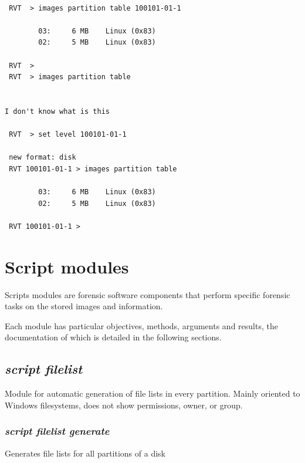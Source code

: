 \documentclass[a4paper,11pt,oneside]{report}
\begin{document}
\begin{verbatim}

 RVT  > images partition table 100101-01-1                                    

        03:     6 MB    Linux (0x83)
        02:     5 MB    Linux (0x83)

 RVT  > 
 RVT  > images partition table


I don't know what is this

 RVT  > set level 100101-01-1                                                 

 new format: disk
 RVT 100101-01-1 > images partition table                                     

        03:     6 MB    Linux (0x83)
        02:     5 MB    Linux (0x83)

 RVT 100101-01-1 > 
\end{verbatim}












\chapter{Script modules} \label{sec:modules}

Scripts modules are forensic software components that perform specific forensic tasks on the stored images and information.

Each module has particular objectives, methods, arguments and results, the documentation of which is detailed in the following sections.





\section{\emph{script filelist}}

Module for automatic generation of file lists in every partition. Mainly oriented to Windows filesystems, does not show permissions, owner, or group.

\subsection{\emph{script filelist generate}} 

Generates file lists for all partitions of a disk
\end{document}
